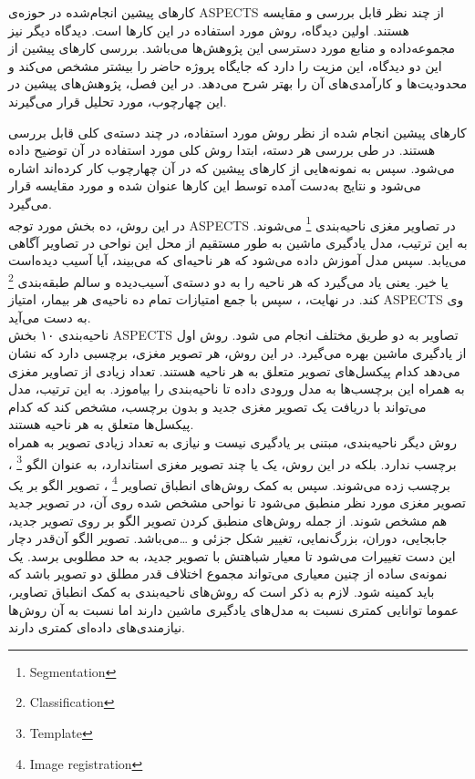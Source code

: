 

 کار‌های پیشین انجام‌شده در حوزه‌ی ASPECTS از چند نظر قابل بررسی و مقایسه هستند.
اولین دیدگاه، روش مورد استفاده در این کارها است.
دیدگاه دیگر نیز مجموعه‌داده و منابع مورد دسترسی این پژوهش‌ها می‌باشد.
بررسی کار‌های پیشین از این دو دیدگاه، این مزیت را دارد 
که جایگاه پروژه حاضر را بیشتر مشخص می‌کند و محدودیت‌ها و کارآمدی‌های آن را 
بهتر شرح می‌دهد.
در این فصل، پژوهش‌های پیشین در این چهارچوب، مورد تحلیل قرار می‌گیرند.

کارهای پیشین انجام شده از نظر روش مورد استفاده، در چند دسته‌ی کلی قابل بررسی هستند.
در طی بررسی هر دسته، ابتدا روش کلی مورد استفاده در آن توضیح داده می‌شود. 
سپس به نمونه‌هایی از کارهای پیشین که در آن چهارچوب کار کرده‌اند اشاره می‌شود
و نتایج به‌دست آمده توسط این کار‌ها عنوان شده و مورد مقایسه قرار می‌گیرد.\\

در این روش، ده بخش مورد توجه ASPECTS در تصاویر مغزی ناحیه‌بندی
\footnote{Segmentation}
 می‌شوند.
به این ترتیب،  
مدل یادگیری ماشین به طور مستقیم از محل این نواحی در تصاویر آگاهی می‌یابد.
سپس مدل آموزش داده می‌شود که هر ناحیه‌ای که می‌بیند، آیا آسیب دیده‌است یا خیر.
یعنی یاد می‌گیرد که هر ناحیه را به دو دسته‌ی آسیب‌دیده و سالم طبقه‌بندی
\footnote{Classification}
کند.
در نهایت، ، سپس با جمع امتیازات تمام ده ناحیه‌ی هر بیمار، امتیاز ASPECTS وی به دست می‌آید.\\

ناحیه‌بندی ۱۰ بخش ASPECTS تصاویر به دو طریق مختلف انجام می شود.
روش اول از یادگیری ماشین بهره می‌گیرد.
در این روش، هر تصویر مغزی، برچسبی دارد که نشان می‌دهد کدام پیکسل‌های تصویر متعلق به هر ناحیه هستند.
تعداد زیادی از تصاویر مغزی به همراه این برچسب‌ها به مدل ورودی داده تا ناحیه‌بندی را بیاموزد.
به این ترتیب، مدل می‌تواند با دریافت یک تصویر مغزی جدید و بدون برچسب، مشخص کند که کدام پیکسل‌ها متعلق به هر ناحیه هستند.\\

روش دیگر ناحیه‌بندی، مبتنی بر یادگیری نیست و نیازی به تعداد زیادی تصویر به همراه برچسب ندارد.
بلکه در این روش، یک یا چند تصویر مغزی استاندارد، به عنوان الگو
\footnote{Template}
، برچسب زده می‌شوند.
سپس به کمک روش‌های انطباق تصاویر
\footnote{Image registration}
، تصویر الگو بر یک تصویر مغزی مورد نظر منطبق می‌شود تا نواحی مشخص شده روی آن، در تصویر جدید هم مشخص شوند.
از جمله روش‌های منطبق کردن تصویر الگو بر روی تصویر جدید، جابجایی، دوران، بزرگ‌نمایی، تغییر شکل جزئی و \dots می‌باشد.
تصویر الگو آن‌قدر دچار این دست تغییرات می‌شود تا معیار شباهتش با تصویر جدید، به حد مطلوبی برسد.
یک نمونه‌ی ساده از چنین معیاری می‌تواند مجموع اختلاف قدر مطلق دو تصویر باشد که باید کمینه شود.
لازم به ذکر است که روش‌های ناحیه‌بندی به کمک انطباق تصاویر، عموما توانایی کمتری نسبت به مدل‌های 
یادگیری ماشین دارند اما نسبت به آن روش‌ها نیازمندی‌های داده‌ای کمتری دارند.\\

